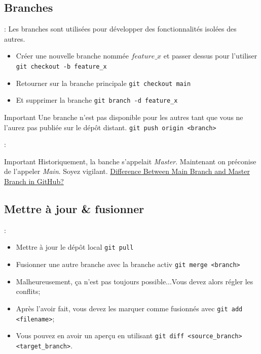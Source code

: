 \documentclass[10pt]{beamer}
\begin{document}
\subsection{Branches}
\begin{frame}{\secname : \subsecname}
    Les branches sont utilisées pour développer des fonctionnalités isolées des autres.
    \begin{itemize}
        \item   Créer une nouvelle branche nommée $feature\_x$ et passer dessus pour l'utiliser
              \lstinline[language=git]!git checkout -b feature_x!
        \item Retourner sur la branche principale
              \lstinline[language=git]!git checkout main!
        \item Et supprimer la branche
              \lstinline[language=git]!git branch -d feature_x!
    \end{itemize}
    \begin{alertblock}{Important}
        Une branche n'est pas disponible pour les autres tant que vous ne l'aurez pas publiée sur le dépôt distant.
        \lstinline[language=git]!git push origin <branch>!
    \end{alertblock}
\end{frame}


\begin{frame}{\secname : \subsecname}
    \begin{alertblock}{Important}
        Historiquement, la banche s’appelait \emph{Master}. Maintenant on préconise de l’appeler \emph{Main}. Soyez vigilant.
        \href{https://stackoverflow.com/questions/64249491/difference-between-main-branch-and-master-branch-in-github}{Difference Between Main Branch and Master Branch in GitHub?}
    \end{alertblock}
\end{frame}

\subsection{Mettre à jour \& fusionner}
\begin{frame}{\secname : \subsecname}

    \begin{itemize}
        \item Mettre à jour le dépôt local \lstinline[language=git]!git pull!
        \item Fusionner une autre branche avec la branche activ \lstinline[language=git]!git merge <branch>!
        \item Malheureusement, ça n'est pas toujours possible...Vous devez alors régler les conflits;
        \item Après l'avoir fait, vous devez les marquer comme fusionnés avec \lstinline[language=git]!git add <filename>!;
        \item Vous pouvez en avoir un aperçu en utilisant \lstinline[language=git]!git diff <source_branch> <target_branch>!.
    \end{itemize}
\end{frame}
\end{document}
